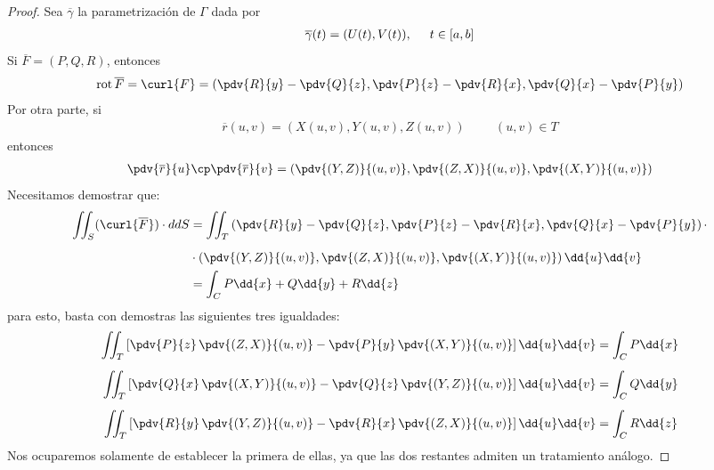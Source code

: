 \begin{proof}

Sea $\overline{\gamma}$ la parametrización de $\Gamma$ dada por
\begin{align*}
\overline{\gamma}(t) = (U(t), V(t)) , \hspace{0.5cm} t \in [a, b]
\end{align*}
Si $\overline{F} = (P, Q, R)$, entonces
\begin{align*}
\text{rot} \, \overline{F} = \curl{F} = \left( \pdv{R}{y} - \pdv{Q}{z}, \pdv{P}{z} - \pdv{R}{x}, \pdv{Q}{x} - \pdv{P}{y} \right)
\end{align*}
Por otra parte, si
\begin{align*}
\overline{r} (u, v) = (X (u, v), Y(u, v), Z(u, v)) \hspace{1cm} (u, v) \in T
\end{align*}
entonces
\begin{align*}
\pdv{\overline{r}}{u} \cp \pdv{\overline{r}}{v} = \left( \pdv{(Y, Z)}{(u, v)}, \pdv{(Z, X)}{(u, v)}, \pdv{(X, Y)}{(u, v)} \right)
\end{align*}
Necesitamos demostrar que:
\begin{align*}
\iint_{S} (\curl{\overline{F}}) \cdot dd{S} &= \iint_{T} \left( \pdv{R}{y} - \pdv{Q}{z}, \pdv{P}{z} - \pdv{R}{x}, \pdv{Q}{x} - \pdv{P}{y} \right) \cdot \\[0.5em]
&\cdot \left( \pdv{(Y, Z)}{(u, v)}, \pdv{(Z, X)}{(u, v)}, \pdv{(X, Y)}{(u, v)} \right) \dd{u} \dd{v} \\
&= \int_{C} P \dd{x} + Q \dd{y} + R \dd{z}
\end{align*}
para esto, basta con demostras las siguientes tres igualdades:
\begin{align}
\begin{aligned}
\iint_{T} \left[ \pdv{P}{z} \, \pdv{(Z, X)}{(u, v)} - \pdv{P}{y} \, \pdv{(X, Y)}{(u, v)} \right] \dd{u} \dd{v} &= \int_{C} P \dd{x} \\[0.5em]
\iint_{T} \left[ \pdv{Q}{x} \, \pdv{(X, Y)}{(u, v)} - \pdv{Q}{z} \, \pdv{(Y, Z)}{(u, v)} \right] \dd{u} \dd{v} &= \int_{C} Q \dd{y} \\[0.5em]
\iint_{T} \left[ \pdv{R}{y} \, \pdv{(Y, Z)}{(u, v)} - \pdv{R}{x} \, \pdv{(Z, X)}{(u, v)} \right] \dd{u} \dd{v} &= \int_{C} R \dd{z}
\end{aligned}
\label{eq:ecuacion_01}
\end{align}
Nos ocuparemos solamente de establecer la primera de ellas, ya que las dos restantes admiten un tratamiento análogo.

\end{proof}
